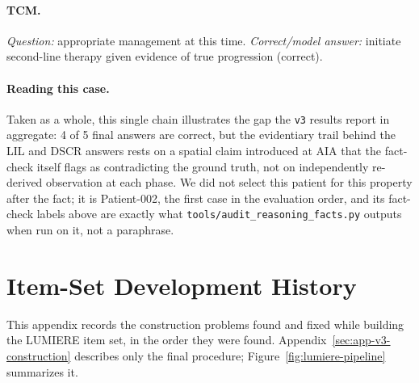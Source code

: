 \documentclass[11pt]{article}
\begin{document}
\paragraph{TCM.} \emph{Question:} appropriate management at this time. \emph{Correct/model answer:} initiate second-line therapy given evidence of true progression (correct).

\paragraph{Reading this case.} Taken as a whole, this single chain illustrates the gap the \texttt{v3} results report in aggregate: 4 of 5 final answers are correct, but the evidentiary trail behind the LIL and DSCR answers rests on a spatial claim introduced at AIA that the fact-check itself flags as contradicting the ground truth, not on independently re-derived observation at each phase. We did not select this patient for this property after the fact; it is Patient-002, the first case in the evaluation order, and its fact-check labels above are exactly what \texttt{tools/audit\_reasoning\_facts.py} outputs when run on it, not a paraphrase.


\section{Item-Set Development History}
\label{sec:dev-history}

This appendix records the construction problems found and fixed while building the LUMIERE item set, in the order they were found. Appendix~\ref{sec:app-v3-construction} describes only the final procedure; Figure~\ref{fig:lumiere-pipeline} summarizes it.
\end{document}
